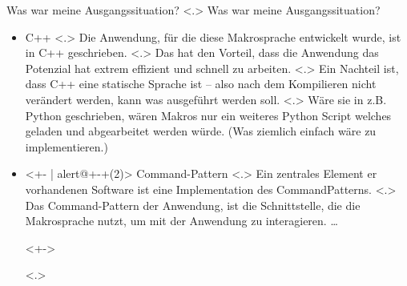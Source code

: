   \begin{frame}{Was war meine Ausgangssituation?}
    \pause
        \note[item]<.>{
          Was war meine Ausgangssituation?
        }

    \begin{itemize}[<+- | alert@+>]
      \item
        C++
            \note[item]<.>{
              Die Anwendung, für die diese Makrosprache entwickelt wurde, ist in C++ geschrieben.
            }
            \note[item]<.>{
              Das hat den Vorteil, dass die Anwendung das Potenzial hat extrem effizient und schnell zu arbeiten.
            }
            \note[item]<.>{
              Ein Nachteil ist, dass C++ eine statische Sprache ist -- also nach dem Kompilieren nicht verändert werden, kann was ausgeführt werden soll.
            }
            \note[item]<.>{
              Wäre sie in z.B. Python geschrieben, wären Makros nur ein weiteres Python Script welches geladen und abgearbeitet werden würde. (Was ziemlich einfach wäre zu implementieren.)
            }
      \item<+- | alert@+-+(2)>
        Command-Pattern%
            \note[item]<.>{
              Ein zentrales Element er vorhandenen Software ist eine Implementation des CommandPatterns.
            }
            \note[item]<.>{
              Das Command-Pattern der Anwendung, ist die Schnittstelle, die die Makrosprache nutzt, um mit der Anwendung zu interagieren. \ldots
            }
        \begin{uncoverenv}<+->%
          \begin{uncoverenv}<.>%
\end{uncoverenv}
\end{uncoverenv}
\end{itemize}
\end{frame}
